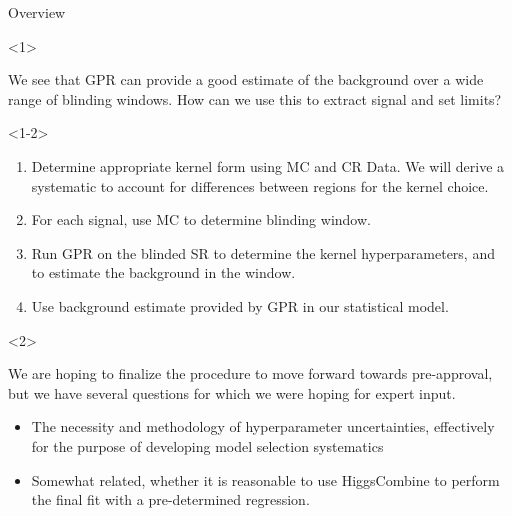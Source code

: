 \documentclass[10pt]{beamer}
\begin{document}
\begin{frame}{Overview}
  \begin{onlyenv}<1>
    \begin{block}{}
      We see that GPR can provide a good estimate of the background over a wide range of blinding windows. How can we use this to extract signal and set limits?
    \end{block}
  \end{onlyenv}
  \begin{onlyenv}<1-2>
    \begin{enumerate}
    \item Determine appropriate kernel form using MC and CR Data. We will derive a systematic to account for differences between regions for the kernel choice.
    \item For each signal, use MC to determine blinding window. 
    \item Run GPR on the blinded SR to determine the kernel hyperparameters, and to estimate the background in the window.
    \item\label{item:5} Use background estimate provided by GPR in our statistical model.
    \end{enumerate}
  \end{onlyenv}
  \begin{onlyenv}<2>
    \begin{block}{
      }    We are hoping to finalize the procedure to move forward towards pre-approval, but we have several questions for which we were hoping for expert input.
      \begin{itemize}

      \item The necessity and methodology of hyperparameter uncertainties, effectively for the purpose of developing model selection systematics%
        
      \item Somewhat related, whether it is reasonable to use HiggsCombine to perform the final fit with a pre-determined regression.
      \end{itemize}
    \end{block}
  \end{onlyenv}
\end{frame}
\end{document}
